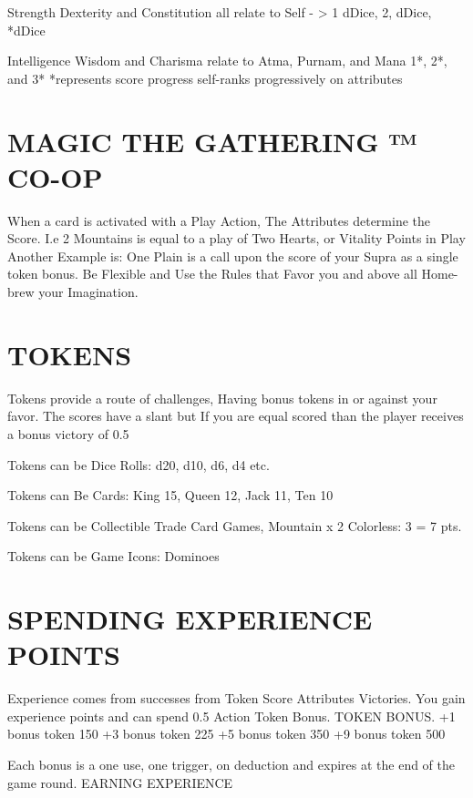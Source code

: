 \documentclass{article}
\begin{document}
Strength Dexterity and Constitution all relate to Self - > 1 dDice, 2, dDice, *dDice

Intelligence Wisdom and Charisma relate to Atma, Purnam, and Mana 1*, 2*, and 3*
*represents score progress self-ranks progressively on attributes

\section{MAGIC THE GATHERING ™ CO-OP}

	When a card is activated with a Play Action, The Attributes determine the Score.
I.e 2 Mountains is equal to a play of Two Hearts, or Vitality Points in Play
Another Example is: One Plain is a call upon the score of your Supra as a single token bonus.
Be Flexible and Use the Rules that Favor you and above all Home-brew your Imagination.

\section{TOKENS}

Tokens provide a route of challenges, Having bonus tokens in or against your favor.
The scores have a slant but If you are equal scored than the player receives a bonus victory of 0.5


Tokens can be Dice Rolls: d20, d10, d6, d4 etc.

Tokens can Be Cards: King 15, Queen 12, Jack 11, Ten 10

Tokens can be Collectible Trade Card Games, Mountain x 2 Colorless: 3 = 7 pts.

Tokens can be Game Icons: Dominoes

\section{SPENDING EXPERIENCE POINTS}

	Experience comes from successes from Token Score Attributes Victories.
You gain experience points and can spend 0.5%
Action Token Bonus.
TOKEN BONUS.
+1 bonus token 150%
+3 bonus token 225%
+5 bonus token 350%
+9 bonus token 500%

Each bonus is a one use, one trigger, on deduction and expires at the end of the game round.
EARNING EXPERIENCE
\end{document}
